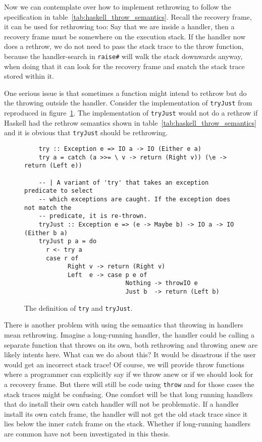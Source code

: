 Now we can contemplate over how to implement rethrowing to follow the
specification in table~\ref{tab:haskell_throw_semantics}. Recall the
recovery frame, it can be used for rethrowing too: Say that we are
inside a handler, then a recovery frame must be somewhere on the
execution stack. If the handler now does a rethrow, we do not need to pass
the stack trace to the throw function, because the handler-search in
\texttt{raise\#} will walk the stack downwards anyway, when doing that
it can look for the recovery frame and snatch the stack trace stored
within it.

One serious issue is that sometimes a function might intend to rethrow
but do the throwing outside the handler. Consider the implementation of
\texttt{tryJust} from \cite{hackage_base_control_exception_base_tryJust}
reproduced in figure~\ref{fig:try_just}. The implementation of \texttt{tryJust} would
not do a rethrow if Haskell had the rethrow semantics shown in
table~\ref{tab:haskell_throw_semantics} and it is obvious that
\texttt{tryJust} should be rethrowing.

\begin{figure}
\begin{mdframed}
  \begin{verbatim}
    try :: Exception e => IO a -> IO (Either e a)
    try a = catch (a >>= \ v -> return (Right v)) (\e -> return (Left e))

    -- | A variant of 'try' that takes an exception predicate to select
    -- which exceptions are caught. If the exception does not match the
    -- predicate, it is re-thrown.
    tryJust :: Exception e => (e -> Maybe b) -> IO a -> IO (Either b a)
    tryJust p a = do
      r <- try a
      case r of
            Right v -> return (Right v)
            Left  e -> case p e of
                            Nothing -> throwIO e
                            Just b  -> return (Left b)
  \end{verbatim}
  \caption{The definition of \texttt{try} and \texttt{tryJust}.}
  \label{fig:try_just}
\end{mdframed}
\end{figure}

There is another problem with using the semantics that throwing in
handlers mean rethrowing. Imagine a long-running handler, the handler
could be calling a separate function that throws on its own, both
rethrowing and throwing anew are likely intents here. What can we
do about this? It would be disastrous if the
user would get an incorrect stack trace! Of course, we will provide
throw functions where a programmer can explicitly say if we throw anew
or if we should look for a recovery frame. But there will still be code
using \texttt{throw} and for those cases the stack traces might be
confusing. One comfort will be that long running handlers that do
install their own catch handler will not be problematic. If a handler install its
own catch frame, the handler will not get the old stack trace
since it lies below the inner catch frame on the stack.
Whether if long-running handlers are common have not been investigated
in this thesis.

